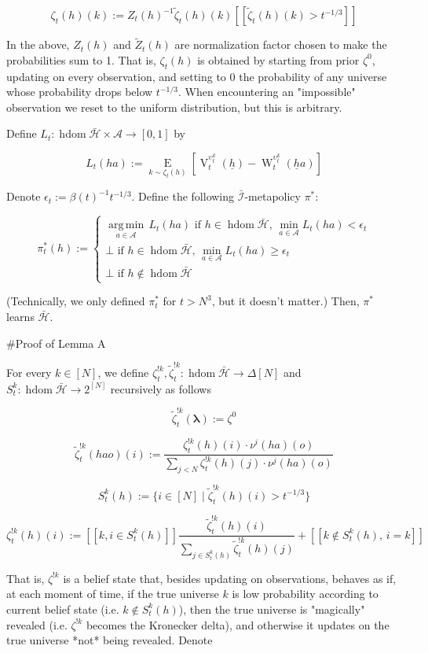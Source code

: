 \documentclass[a4paper]{article}
\newcommand{\E}[1]{\underset{#1}{\operatorname{E}}}
\newcommand{\Argmin}[1]{\underset{#1}{\operatorname{arg\,min}}\,}
\newcommand{\Estr}{\boldsymbol{\lambda}}
\newcommand{\A}{\mathcal{A}}
\newcommand{\I}{\mathcal{I}}
\newcommand{\Adi}{\bar{\I}}
\DeclareMathOperator{\HD}{hdom}
\newcommand{\Hy}{\mathcal{H}}
\newcommand{\V}{\operatorname{V}}
\newcommand{\W}{\operatorname{W}}
\begin{document}
$$\zeta_t(h)(k):=Z_t(h)^{-1}\tilde{\zeta}_t(h)(k)[[\tilde{\zeta}_t(h)(k) > t^{-1/3}]]$$

In the above, $Z_t(h)$ and $\tilde{Z}_t(h)$ are normalization factor chosen to make the probabilities sum to 1. That is, $\zeta_t(h)$ is obtained by starting from prior $\zeta^0$, updating on every observation, and setting to 0 the probability of any universe whose probability drops below $t^{-1/3}$. When encountering an "impossible" observation we reset to the uniform distribution, but this is arbitrary. 

Define $L_t: \HD{\bar{\Hy}} \times \A \rightarrow [0,1]$ by

$$L_t(ha):=\E{k \sim \zeta_t(h)}[\V^{\upsilon^k_t}_t(\underline{h})-\W^{\upsilon^k_t}_t(\underline{h}a)]$$

Denote $\epsilon_t:=\beta(t)^{-1}t^{-1/3}$. Define the following $\Adi$-metapolicy $\pi^*$:

$$\pi^*_t(h):=\begin{cases} \Argmin{a \in \A} L_t(ha) \text{ if } h \in \HD{\bar{\Hy}},\, \min_{a \in \A}{L_t(ha)} < \epsilon_t \\ \bot \text{ if } h \in \HD{\bar{\Hy}},\,\min_{a \in \A}{L_t(ha)} \geq \epsilon_t \\ \bot \text{ if } h \not\in \HD{\bar{\Hy}}\end{cases}$$

(Technically, we only defined $\pi^*_t$ for $t > N^3$, but it doesn't matter.) Then, $\pi^*$ learns $\bar{\Hy}$.
 
\#Proof of Lemma A

For every $k \in [N]$, we define $\zeta^{!k}_t, \tilde{\zeta}^{!k}_t: \HD{\bar{\Hy}} \rightarrow \Delta[N]$ and $S_t^k: \HD{\bar{\Hy}} \rightarrow 2^{[N]}$ recursively as follows

$$\tilde{\zeta}^{!k}_t(\Estr):=\zeta^0$$

$$\tilde{\zeta}^{!k}_t(hao)(i):=\frac{\zeta^{!k}_t(h)(i) \cdot \nu^i(ha)(o)}{\sum_{j < N} \zeta^{!k}_t(h)(j) \cdot \nu^j(ha)(o)}$$

$$S_t^k(h):=\{i \in [N] \mid \tilde{\zeta}^{!k}_t(h)(i) > t^{-1/3}\}$$

$$\zeta^{!k}_t(h)(i):= [[k,i \in S_t^k(h)]]\frac{\tilde{\zeta}^{!k}_t(h)(i)}{\sum_{j \in S_t^k(h)}\tilde{\zeta}^{!k}_t(h)(j)}+[[k \not\in S_t^k(h),\,i=k]]$$

That is, $\zeta^{!k}$ is a belief state that, besides updating on observations, behaves as if, at each moment of time, if the true universe $k$ is low probability according to current belief state (i.e. $k \not\in S^k_t(h)$), then the true universe is "magically" revealed (i.e. $\zeta^{!k}$ becomes the Kronecker delta), and otherwise it updates on the true universe *not* being revealed. Denote 
\end{document}
